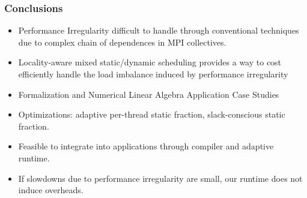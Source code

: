 \begin{frame} 
  \frametitle{Conclusions} 
  \begin{itemize} 
  \item \small Performance Irregularity difficult to handle through conventional techniques due to complex chain of dependences in MPI collectives.
  \item \small Locality-aware mixed static/dynamic scheduling provides a way to cost efficiently handle the load imbalance induced by performance irregularity  
  \item \small Formalization and Numerical Linear Algebra Application Case Studies  
  \item \small Optimizations: adaptive per-thread static fraction, slack-conscious static fraction.
  \item \small Feasible to integrate into applications through compiler and adaptive runtime.
  \item \small If slowdowns due to performance irregularity are small, our runtime does not induce overheads.  
  \end{itemize}      
\end{frame}

%
% 
